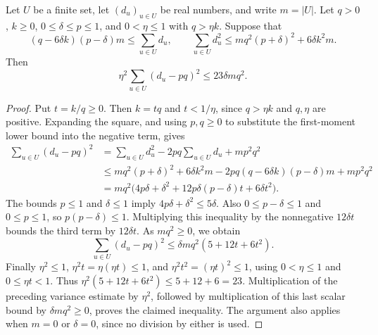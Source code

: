 \begin{lemma}
Let $U$ be a finite set, let $(d_u)_{u\in U}$ be real numbers, and write $m=|U|$.
Let $q>0$, $k\geq0$, $0\leq\delta\leq p\leq1$, and $0<\eta\leq1$ with
$q>\eta k$. Suppose that
\[
 (q-6\delta k)(p-\delta)m\leq\sum_{u\in U}d_u,
 \qquad
 \sum_{u\in U}d_u^2\leq mq^2(p+\delta)^2+6\delta k^2m.
\]
Then
\[
 \eta^2\sum_{u\in U}(d_u-pq)^2\leq23\delta mq^2.
\]
\end{lemma}
\begin{proof}
Put $t=k/q\geq0$. Then $k=tq$ and $t<1/\eta$, since $q>\eta k$ and
$q,\eta$ are positive. Expanding the square, and using $p,q\geq0$ to
substitute the first-moment lower bound into the negative term, gives
\begin{align*}
 \sum_{u\in U}(d_u-pq)^2
 &=\sum_{u\in U}d_u^2-2pq\sum_{u\in U}d_u+mp^2q^2\\
 &\leq mq^2(p+\delta)^2+6\delta k^2m
       -2pq(q-6\delta k)(p-\delta)m+mp^2q^2\\
 &=mq^2\bigl(4p\delta+\delta^2
       +12p\delta(p-\delta)t+6\delta t^2\bigr).
\end{align*}
The bounds $p\leq1$ and $\delta\leq1$ imply
$4p\delta+\delta^2\leq5\delta$. Also
$0\leq p-\delta\leq1$ and $0\leq p\leq1$, so
$p(p-\delta)\leq1$. Multiplying this inequality by the nonnegative
$12\delta t$ bounds the third term by $12\delta t$. As $mq^2\geq0$, we obtain
\[
 \sum_{u\in U}(d_u-pq)^2\leq\delta mq^2(5+12t+6t^2).
\]
Finally $\eta^2\leq1$, $\eta^2t=\eta(\eta t)\leq1$, and
$\eta^2t^2=(\eta t)^2\leq1$, using $0<\eta\leq1$ and $0\leq\eta t<1$.
Thus $\eta^2(5+12t+6t^2)\leq5+12+6=23$.
Multiplication of the preceding variance estimate by $\eta^2$, followed
by multiplication of this last scalar bound by $\delta mq^2\geq0$,
proves the claimed inequality. The argument also applies when $m=0$
or $\delta=0$, since no division by either is used.
\end{proof}
